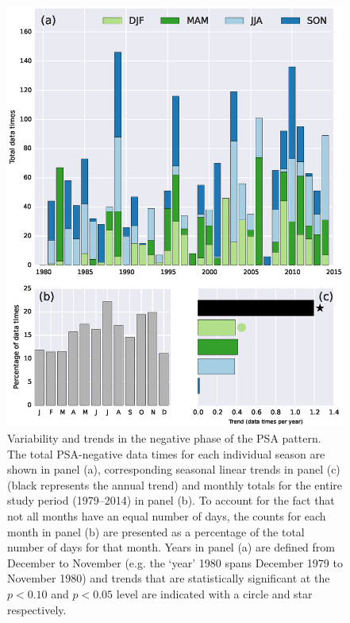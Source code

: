 \begin{figure}
\begin{center}
\includegraphics[width=0.9\columnwidth]{figures/psa/psa-seasonality-psa-neg_ERAInterim_500hPa-lat10S10Nmean-lon115E235Ezeropad_030day-runmean-anom-wrt-all_native-np20N260E.eps}
\caption[Variability and trends in the negative phase of the PSA pattern]{\label{fig:psa-neg_seasonality}
Variability and trends in the negative phase of the PSA pattern. The total PSA-negative data times for each individual season are shown in panel (a), corresponding seasonal linear trends in panel (c) (black represents the annual trend) and monthly totals for the entire study period (1979--2014) in panel (b). To account for the fact that not all months have an equal number of days, the counts for each month in panel (b) are presented as a percentage of the total number of days for that month. Years in panel (a) are defined from December to November (e.g. the `year' 1980 spans December 1979 to November 1980) and trends that are statistically significant at the $p < 0.10$ and $p < 0.05$ level are indicated with a circle and star respectively.%
}
\end{center}
\end{figure}

